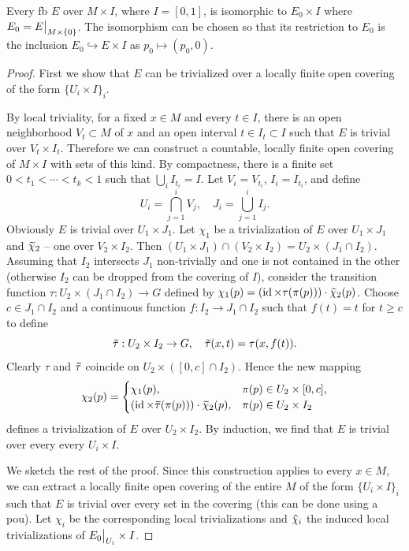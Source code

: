 \begin{thm}\label{bundles over MxI}
    Every \gls{fb} $E$ over $M\times I$, where $I=[0,1]$, is isomorphic to $E_0\times I$ where $E_0=\restr{E}{M\times\{0\}}$. The isomorphism can be chosen so that its restriction to $E_0$ is the inclusion $E_0\hookrightarrow E\times I$ as $p_0\mapsto (p_0,0)$.
\end{thm}
\begin{proof}
    First we show that $E$ can be trivialized over a locally finite open covering of the form $\{U_i\times I\}_i$.

    By local triviality, for a fixed $x\in M$ and every $t\in I$, there is an open neighborhood $V_t\subset M$ of $x$ and an open interval $t\in I_t\subset I$ such that $E$ is trivial over $V_t\times I_t$. Therefore we can construct a countable, locally finite open covering of $M\times I$ with sets of this kind. By compactness, there is a finite set $0<t_1<\cdots<t_k<1$ such that $\bigcup_i I_{t_i}=I$. Let $V_i=V_{t_i}$, $I_i=I_{t_i}$, and define 
    \[
        U_i=\bigcap_{j=1}^i V_j,\quad J_i=\bigcup_{j=1}^i I_j.
    \]
    Obviously $E$ is trivial over $U_1\times J_1$. Let $\chi_1$ be a trivialization of $E$ over $U_1\times J_1$ and $\wt{\chi}_2$ -- one over $V_2\times I_2$. Then $(U_1\times J_1)\cap (V_2\times I_2)=U_2\times (J_1\cap I_2)$. Assuming that $I_2$ intersects $J_1$ non-trivially and one is not contained in the other (otherwise $I_2$ can be dropped from the covering of $I$), consider the transition function $\tau:U_2\times(J_1\cap I_2)\to G$ defined by $\chi_1(p)=\left(\id\times    \tau(\pi(p))\right)\cdot \wt{\chi}_2(p)$. Choose $c\in J_1\cap I_2$ and a continuous function $f:I_2\to J_1\cap I_2$ such that $f(t)=t$ for $t\geq c$ to define 
    \[
        \wt{\tau}:U_2\times I_2\to G,\quad \wt{\tau}(x,t)=\tau(x,f(t)).
    \]
    Clearly $\tau$ and $\wt{\tau}$ coincide on $U_2\times([0,c]\cap I_2)$. Hence the new mapping
    \[
    \chi_2(p)=\begin{cases}
    \chi_1(p), & \pi(p)\in U_2\times[0,c],\\
    (\id\times\wt{\tau}(\pi(p)))\cdot \wt{\chi}_2(p), & \pi(p)\in U_2\times I_2
    \end{cases}
    \]
    defines a trivialization of $E$ over $U_2\times I_2$. By induction, we find that $E$ is trivial over every every $U_i\times I$. 

    We sketch the rest of the proof. Since this construction applies to every $x\in M$, we can extract a locally finite open covering of the entire $M$ of the form $\{U_i\times I\}_i$ such that $E$ is trivial over every set in the covering (this can be done using a \gls{pou}). Let $\chi_i$ be the corresponding local trivializations and $\wh{\chi}_i$ the induced local trivializations of $\restr{E_0}{U_i}\times I$.


\end{proof}
